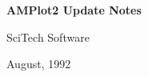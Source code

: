 \pagestyle{empty}

\LARGE
\vspace*{0.5in}
\begin{center}
{\bf AMPlot2 Update Notes}

\vspace*{0.5in}
{\sf SciTech Software} 

\vspace*{1em}
August, 1992
\end{center}

